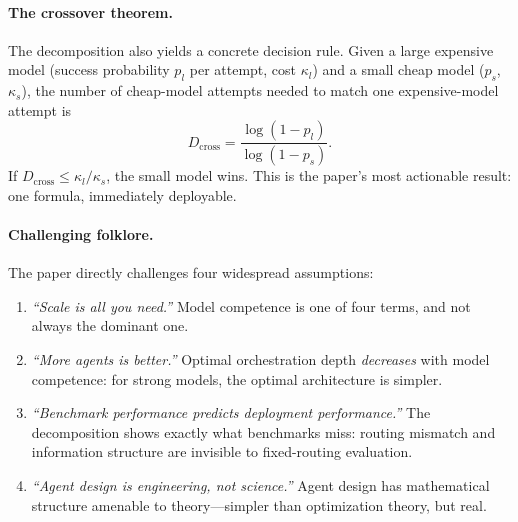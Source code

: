 \documentclass[twoside,11pt]{article}
\newcommand{\Dcross}{D_{\mathrm{cross}}}
\begin{document}
\paragraph{The crossover theorem.}
The decomposition also yields a concrete decision rule.
Given a large expensive model (success probability $p_l$ per attempt, cost $\kappa_l$) and a small cheap model ($p_s$, $\kappa_s$), the number of cheap-model attempts needed to match one expensive-model attempt is
\begin{equation}
\label{eq:crossover-intro}
\Dcross = \frac{\log(1 - p_l)}{\log(1 - p_s)}.
\end{equation}
If $\Dcross \le \kappa_l/\kappa_s$, the small model wins.
This is the paper's most actionable result: one formula, immediately deployable.

\paragraph{Challenging folklore.}
The paper directly challenges four widespread assumptions:

\begin{enumerate}
\item \emph{``Scale is all you need.''}\;
Model competence is one of four terms, and not always the dominant one.

\item \emph{``More agents is better.''}\;
Optimal orchestration depth \emph{decreases} with model competence: for strong models, the optimal architecture is simpler.

\item \emph{``Benchmark performance predicts deployment performance.''}\;
The decomposition shows exactly what benchmarks miss: routing mismatch and information structure are invisible to fixed-routing evaluation.

\item \emph{``Agent design is engineering, not science.''}\;
Agent design has mathematical structure amenable to theory---simpler than optimization theory, but real.
\end{enumerate}
\end{document}
